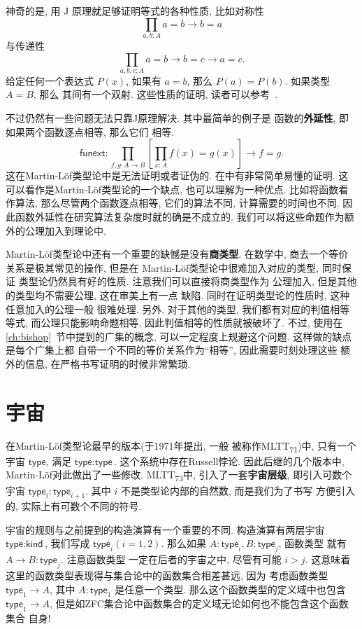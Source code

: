 \documentclass[UTF8]{ctexbook}
\newcommand{\cons}[1]{\textsf{#1}}
\theoremstyle{plain}
\theoremstyle{definition}
\theoremstyle{remark}
\begin{document}
神奇的是, 用 J 原理就足够证明等式的各种性质, 比如对称性
\[\prod_{a,b:A} a = b \to b = a\]
与传递性
\[\prod_{a,b,c:A} a=b \to b=c \to a=c.\]
给定任何一个表达式 \(P(x)\), 如果有 \(a=b\),
那么 \(P(a) = P(b)\). 如果类型 \(A = B\), 那么
其间有一个双射. 这些性质的证明, 读者可以参考~\cite[\S1.12]{ufp:2013:hottbook}.

不过仍然有一些问题无法只靠J原理解决. 其中最简单的例子是
函数的\textbf{外延性}, 即如果两个函数逐点相等, 那么它们
相等.
\[\cons{funext} : \prod_{f,g : A \to B}
\left[\prod_{x : A} f(x) = g(x)\right] \to f = g.\]
这在Martin-L\"of类型论中是无法证明或者证伪的.
在\cite{boulier:2017:syntacticmodel}中有非常简单易懂的证明.
这可以看作是Martin-L\"of类型论的一个缺点, 也可以理解为一种优点.
比如将函数看作算法, 那么尽管两个函数逐点相等, 它们的算法不同,
计算需要的时间也不同. 因此函数外延性在研究算法复杂度时就的确是不成立的.
我们可以将这些命题作为额外的公理加入到理论中.

Martin-L\"of类型论中还有一个重要的缺憾是没有\textbf{商类型}.
在数学中, 商去一个等价关系是极其常见的操作, 但是在
Martin-L\"of类型论中很难加入对应的类型, 同时保证
类型论仍然具有好的性质. 注意我们可以直接将商类型作为
公理加入, 但是其他的类型均不需要公理, 这在审美上有一点
缺陷. 同时在证明类型论的性质时, 这种任意加入的公理一般
很难处理. 另外, 对于其他的类型, 我们都有对应的判值相等等式,
而公理只能影响命题相等, 因此判值相等的性质就被破坏了.
不过, 使用在 \ref{ch:bishop}~节中提到的广集的概念,
可以一定程度上规避这个问题. 这样做的缺点是每个广集上都
自带一个不同的等价关系作为“相等”, 因此需要时刻处理这些
额外的信息, 在严格书写证明的时候非常繁琐.

\section{宇宙}

在Martin-L\"of类型论最早的版本(于1971年提出, 一般
被称作MLTT\textsubscript{71})中, 只有一个宇宙
\(\cons{type}\), 满足 \(\cons{type} : \cons{type}\).
这个系统中存在Russell悖论. 因此后继的几个版本中,
Martin-L\"of对此做出了一些修改. MLTT\textsubscript{73}中,
引入了一套\textbf{宇宙层级}, 即引入可数个宇宙
\(\cons{type}_i : \cons{type}_{i+1}\).
其中 \(i\) 不是类型论内部的自然数, 而是我们为了书写
方便引入的, 实际上有可数个不同的符号.

宇宙的规则与之前提到的构造演算有一个重要的不同.
构造演算有两层宇宙 \(\cons{type} : \cons{kind}\),
我们写成 \(\cons{type}_i (i = 1,2)\). 那么如果
\(A : \cons{type}_i, B : \cons{type}_j\), 函数类型
就有 \(A \to B : \cons{type}_j\). 注意函数类型
一定在后者的宇宙之中, 尽管有可能 \(i > j\). 这意味着
这里的函数类型表现得与集合论中的函数集合相差甚远, 因为
考虑函数类型 \(\cons{type}_1 \to A\), 其中 \(A : \cons{type}_1\)
是任意一个类型. 那么这个函数类型的定义域中也包含 \(\cons{type}_1 \to A\),
但是如ZFC集合论中函数集合的定义域无论如何也不能包含这个函数集合
自身!
\end{document}
